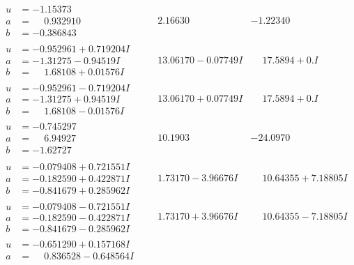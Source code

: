 \documentclass[1p]{elsarticle_modified}
\theoremstyle{definition}
\begin{document}
$$\begin{array}{c|c|c}
\begin{aligned}
u &= -1.15373\phantom{ +0.000000I} \\
a &= \phantom{-}0.932910\phantom{ +0.000000I} \\
b &= -0.386843\phantom{ +0.000000I}\end{aligned}
 & \phantom{-}2.16630\phantom{ +0.000000I} & -1.22340\phantom{ +0.000000I} \\ \hline\begin{aligned}
u &= -0.952961 + 0.719204 I \\
a &= -1.31275 - 0.94519 I \\
b &= \phantom{-}1.68108 + 0.01576 I\end{aligned}
 & \phantom{-}13.06170 - 0.07749 I & \phantom{-}17.5894 + 0. I\phantom{ +0.000000I} \\ \hline\begin{aligned}
u &= -0.952961 - 0.719204 I \\
a &= -1.31275 + 0.94519 I \\
b &= \phantom{-}1.68108 - 0.01576 I\end{aligned}
 & \phantom{-}13.06170 + 0.07749 I & \phantom{-}17.5894 + 0. I\phantom{ +0.000000I} \\ \hline\begin{aligned}
u &= -0.745297\phantom{ +0.000000I} \\
a &= \phantom{-}6.94927\phantom{ +0.000000I} \\
b &= -1.62727\phantom{ +0.000000I}\end{aligned}
 & \phantom{-}10.1903\phantom{ +0.000000I} & -24.0970\phantom{ +0.000000I} \\ \hline\begin{aligned}
u &= -0.079408 + 0.721551 I \\
a &= -0.182590 + 0.422871 I \\
b &= -0.841679 + 0.285962 I\end{aligned}
 & \phantom{-}1.73170 - 3.96676 I & \phantom{-}10.64355 + 7.18805 I \\ \hline\begin{aligned}
u &= -0.079408 - 0.721551 I \\
a &= -0.182590 - 0.422871 I \\
b &= -0.841679 - 0.285962 I\end{aligned}
 & \phantom{-}1.73170 + 3.96676 I & \phantom{-}10.64355 - 7.18805 I \\ \hline\begin{aligned}
u &= -0.651290 + 0.157168 I \\
a &= \phantom{-}0.836528 - 0.648564 I \\

\end{aligned}
\end{array}$$
\end{document}
